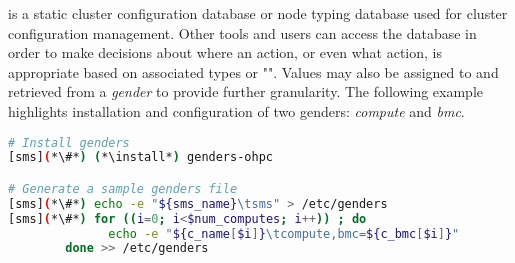 \genders{} is a static cluster configuration database or node typing database
used for cluster configuration management. Other tools and users can access the
\genders{} database in order to make decisions about where an action, or even
what action, is appropriate based on associated types or "\genders{}".  Values
may also be assigned to and retrieved from a {\em gender} to provide further
granularity. The following example highlights installation and configuration of
two {genders}: {\em compute} and {\em bmc}.

\begin{lstlisting}[language=bash,keywords={},upquote=true]
# Install genders
[sms](*\#*) (*\install*) genders-ohpc

# Generate a sample genders file
[sms](*\#*) echo -e "${sms_name}\tsms" > /etc/genders
[sms](*\#*) for ((i=0; i<$num_computes; i++)) ; do
              echo -e "${c_name[$i]}\tcompute,bmc=${c_bmc[$i]}"
        done >> /etc/genders
\end{lstlisting}

